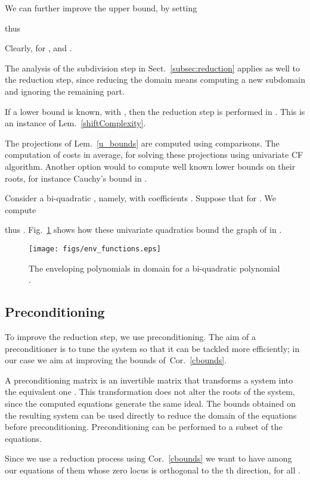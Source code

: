 \documentclass{sig-alternate}
\begin{document}
We can further improve the upper bound, by setting
  
thus


Clearly, for ,  and .
\fi


 The analysis of the
subdivision step in Sect.~\ref{subsec:reduction} applies as well to the reduction step,
since reducing the domain means computing a new subdomain and ignoring the
remaining part.

If a lower bound  is known, with , then
the reduction step is 
performed in . This is an
instance of Lem.~\ref{shiftComplexity}. 

The projections of Lem.~\ref{u_bounds} are computed using  comparisons. The computation of  costs  in average, for solving these projections using univariate CF algorithm. Another option would to compute well known lower bounds on their roots, for instance Cauchy's bound in .
 
 Consider a bi-quadratic , namely,  with coefficients . Suppose that  for . We compute

thus . Fig.~\ref{fig:env} shows how these univariate quadratics bound the graph of  in .
\begin{figure}[h]
  \centering
  \texttt{[image: figs/env\_functions.eps]}
  \caption{The enveloping polynomials  in domain  for a bi-quadratic polynomial .}
  \label{fig:env}
\end{figure}

\subsection{Preconditioning}

To improve the reduction step, we use preconditioning. 
The aim of a preconditioner is to tune the system so that it can be
tackled more efficiently; in our case we aim at improving the bounds
of~Cor.~\ref{cbounds}.

A preconditioning matrix  is an invertible  matrix that
transforms a system  into the equivalent one
. 
This transformation does not alter the roots of the system, since the
computed equations generate the same ideal. The bounds obtained on the
resulting system can be used directly to reduce the domain of the
equations before preconditioning.
Preconditioning can be performed to a subset of the equations.

Since we use a reduction process using Cor.~\ref{cbounds} we
want to have among our equations  of them whose zero locus
 is orthogonal to the th direction, for all
.
\end{document}
